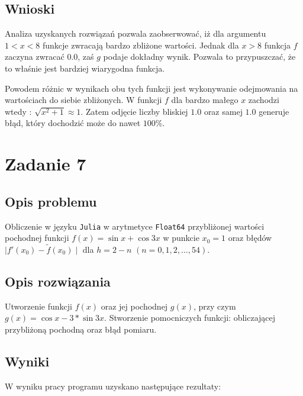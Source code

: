 \documentclass{classrep}
\begin{document}
	\subsection{Wnioski}
		Analiza uzyskanych rozwiązań pozwala zaobserwować, iż dla argumentu $1<x<8$ funkcje zwracają bardzo 
		zbliżone wartości. Jednak dla $x>8$ funkcja $f$ zaczyna zwracać $0.0$, zaś $g$ podaje dokładny wynik. 
		Pozwala to przypuszczać, że to właśnie jest bardziej wiarygodna funkcja.
		
		Powodem różnic w wynikach obu tych funkcji jest wykonywanie odejmowania na wartościach do siebie zbliżonych.
		W funkcji $f$ dla bardzo małego $x$ zachodzi wtedy :
		$\sqrt{x^{2}+1} \approx 1$. Zatem odjęcie liczby bliskiej $1.0$ oraz samej $1.0$ generuje błąd, który dochodzić może do nawet $100\%$.
\section{Zadanie 7}
	\subsection{Opis problemu}
		Obliczenie w języku \texttt{Julia} w arytmetyce \texttt{Float64} przybliżonej wartości pochodnej funkcji
		$f(x)=\sin{x}+\cos{3x}$ w punkcie $x_0=1$ oraz błędów $\mid f'(x_0)-\tilde{f}(x_0) \mid$ dla 
		$h=2-n$ $(n=0,1,2,\dots,54)$.
	\subsection{Opis rozwiązania}
		Utworzenie funkcji $f(x)$ oraz jej pochodnej $g(x)$, przy czym $g(x)=\cos{x}-3*\sin{3x}$. Stworzenie 
		pomocniczych funkcji: obliczającej przybliżoną pochodną oraz błąd pomiaru.
	\subsection{Wyniki}
		W wyniku pracy programu uzyskano następujące rezultaty:
		
\end{document}
